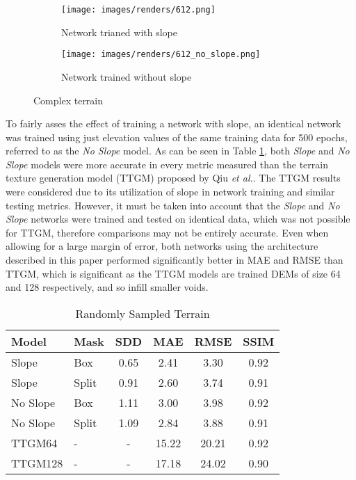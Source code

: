 \documentclass[twocolumn]{article}
\begin{document}
\begin{figure*}[p]
\begin{subfigure}{1\columnwidth}
  \caption{Network trianed with slope}
  \texttt{[image: images/renders/612.png]}
  \label{fig:612}
\end{subfigure}
\hfill
\begin{subfigure}{1\columnwidth}
  \caption{Network trained without slope}
  \texttt{[image: images/renders/612\_no\_slope.png]}
  \label{fig:612_no_slope}
\end{subfigure}
\caption{Complex terrain}
\label{fig:complex_terrain}
\end{figure*}

To fairly asses the effect of training a network with slope, an identical network was trained using just elevation values of the same training data for 500 epochs, referred to as the \emph{No Slope} model.
As can be seen in Table \ref{table:random_terrain}, both \emph{Slope} and \emph{No Slope} models were more accurate in every metric measured than the terrain texture generation model (TTGM) proposed by Qiu \emph{et al.}\autocite{qiuVoidFillingDigital2019}.
The TTGM results were considered due to its utilization of slope in network training and similar testing metrics.
However, it must be taken into account that the \emph{Slope} and \emph{No Slope} networks were trained and tested on identical data, which was not possible for TTGM, therefore comparisons may not be entirely accurate.
Even when allowing for a large margin of error, both networks using the architecture described in this paper performed significantly better in MAE and RMSE than TTGM, which is significant as the TTGM models are trained DEMs of size 64 and 128 respectively, and so infill smaller voids.

\begin{table}[htbp]
\caption{\label{table:random_terrain}Randomly Sampled Terrain}
\centering
\begin{tabular}{llcccc}
Model & Mask & SDD & MAE & RMSE & SSIM\\[0pt]
\hline
Slope & Box & 0.65 & 2.41 & 3.30 & 0.92\\[0pt]
Slope & Split & 0.91 & 2.60 & 3.74 & 0.91\\[0pt]
No Slope & Box & 1.11 & 3.00 & 3.98 & 0.92\\[0pt]
No Slope & Split & 1.09 & 2.84 & 3.88 & 0.91\\[0pt]
TTGM64 & - & - & 15.22 & 20.21 & 0.92\\[0pt]
TTGM128 & - & - & 17.18 & 24.02 & 0.90\\[0pt]
\end{tabular}
\end{table}
\end{document}
